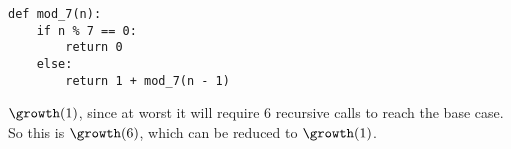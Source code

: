 \begin{blocksection}
\question \begin{lstlisting}
def mod_7(n):
    if n % 7 == 0:
        return 0
    else:
        return 1 + mod_7(n - 1)
\end{lstlisting}

\begin{solution}[0.0in]
    $\growth(1)$, since at worst it will require 6 recursive calls to reach the
    base case. So this is $\growth(6)$, which can be reduced to $\growth(1)$.
\end{solution}
\end{blocksection}
